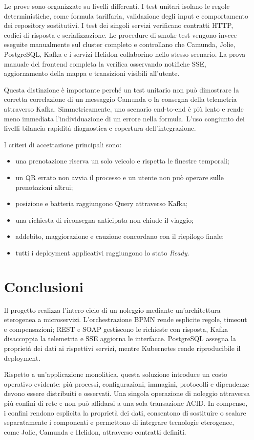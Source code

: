 \documentclass[12pt,a4paper,twoside]{report}
\newcommand{\capitoloNum}[1]{\chapter{#1}}
\begin{document}
Le prove sono organizzate su livelli differenti. I test unitari isolano le
regole deterministiche, come formula tariffaria, validazione degli input e
comportamento dei repository sostitutivi. I test dei singoli servizi
verificano contratti HTTP, codici di risposta e serializzazione. Le procedure
di smoke test vengono invece eseguite manualmente sul cluster completo e
controllano che Camunda, Jolie, PostgreSQL, Kafka e i servizi Helidon
collaborino nello stesso scenario. La prova manuale del frontend completa la
verifica osservando notifiche SSE, aggiornamento della mappa e transizioni
visibili all'utente.

Questa distinzione è importante perché un test unitario non può dimostrare la
corretta correlazione di un messaggio Camunda o la consegna della telemetria
attraverso Kafka. Simmetricamente, uno scenario end-to-end è più lento e
rende meno immediata l'individuazione di un errore nella formula. L'uso
congiunto dei livelli bilancia rapidità diagnostica e copertura
dell'integrazione.

I criteri di accettazione principali sono:
\begin{itemize}
  \item una prenotazione riserva un solo veicolo e rispetta le finestre
        temporali;
  \item un QR errato non avvia il processo e un utente non può operare sulle
        prenotazioni altrui;
  \item posizione e batteria raggiungono Query attraverso Kafka;
  \item una richiesta di riconsegna anticipata non chiude il viaggio;
  \item addebito, maggiorazione e cauzione concordano con il riepilogo finale;
  \item tutti i deployment applicativi raggiungono lo stato \emph{Ready}.
\end{itemize}

\capitoloNum{Conclusioni}

Il progetto realizza l'intero ciclo di un noleggio mediante un'architettura
eterogenea a microservizi. L'orchestrazione BPMN rende esplicite regole,
timeout e compensazioni; REST e SOAP gestiscono le richieste con risposta,
Kafka disaccoppia la telemetria e SSE aggiorna le interfacce. PostgreSQL
assegna la proprietà dei dati ai rispettivi servizi, mentre Kubernetes rende
riproducibile il deployment.

Rispetto a un'applicazione monolitica, questa soluzione introduce un costo
operativo evidente: più processi, configurazioni, immagini, protocolli e
dipendenze devono essere distribuiti e osservati. Una singola operazione di
noleggio attraversa più confini di rete e non può affidarsi a una sola
transazione ACID. In compenso, i confini rendono esplicita la proprietà dei
dati, consentono di sostituire o scalare separatamente i componenti e
permettono di integrare tecnologie eterogenee, come Jolie, Camunda e Helidon,
attraverso contratti definiti.
\end{document}
